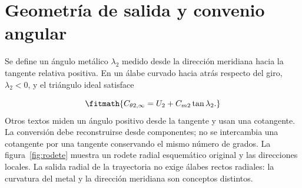 \documentclass[10pt,openany]{book}
\begin{document}
\section{Geometría de salida y convenio angular}

Se define un ángulo metálico \(\lambda_2\) medido desde la dirección meridiana hacia la tangente relativa positiva. En un álabe curvado hacia atrás respecto del giro, \(\lambda_2<0\), y el triángulo ideal satisface

\[
\fitmath{C_{\theta2,\infty}=U_2+C_{m2}\tan\lambda_2.}
\]
Otros textos miden un ángulo positivo desde la tangente y usan una cotangente. La conversión debe reconstruirse desde componentes; no se intercambia una cotangente por una tangente conservando el mismo número de grados.
La figura~\ref{fig:rodete} muestra un rodete radial esquemático original y las direcciones locales. La salida radial de la trayectoria no exige álabes rectos radiales: la curvatura del metal y la dirección meridiana son conceptos distintos.
\end{document}
